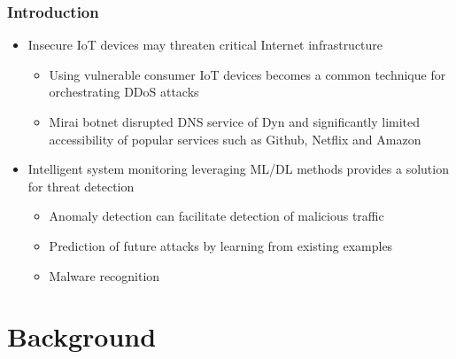 \documentclass[10pt, presentation]{beamer}
\begin{document}
    \begin{frame}
        \frametitle{Introduction}
        \begin{itemize}
            \item Insecure IoT devices may threaten critical Internet infrastructure \cite{article:16}
            \begin{itemize}
                \item Using vulnerable consumer IoT devices becomes a common technique for orchestrating DDoS attacks
                \item Mirai botnet disrupted DNS service of Dyn and significantly limited accessibility of popular services such as Github, Netflix and Amazon
            \end{itemize}
            \item Intelligent system monitoring leveraging ML/DL methods provides a solution for threat detection
            \begin{itemize}
                \item Anomaly detection can facilitate detection of malicious traffic \cite{zargar2013survey}
                \item Prediction of future attacks by learning from existing examples
                \item Malware recognition
            \end{itemize}
        \end{itemize}
    \end{frame}



    \section{Background}
\end{document}
